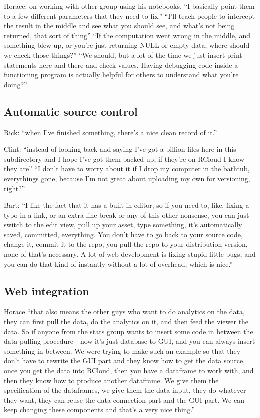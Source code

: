 Horace: on working with other group using his notebooks, ``I basically point them to a few different parameters that they need to fix.'' ``I'll teach people to intercept the result in the middle and see what you should see, and what's not being returned, that sort of thing'' ``If the computation went wrong in the middle, and something blew up, or you're just returning NULL or empty data, where should we check those things?'' ``We should, but a lot of the time we just insert print statements here and there and check values. Having debugging code inside a functioning program is actually helpful for others to understand what you're doing?''


\subsection{Automatic source control}
Rick: ``when I've finished something, there's a nice clean record of it.''

Clint: ``instead of looking back and saying I've got a billion files here in this subdirectory and I hope I've got them backed up, if they're on RCloud I know they are'' ``I don't have to worry about it if I drop my computer in the bathtub, everythings gone, because I'm not great about uploading my own for versioning, right?''

Bart: ``I like the fact that it has a built-in editor, so if you need to, like, fixing a typo in a link, or an extra line break or any of this other nonsense, you can just switch to the edit view, pull up your asset, type something, it's automatically saved, committed, everything. You don't have to go back to your source code, change it, commit it to the repo, you pull the repo to your distribution version, none of that's necessary. A lot of web development is fixing stupid little bugs, and you can do that kind of instantly without a lot of overhead, which is nice.''

\subsection{Web integration}
Horace ``that also means the other guys who want to do analytics on the data, they can first pull the data, do the analytics on it, and then feed the viewer the data. So if anyone from the stats group wants to insert some code in between the data pulling procedure - now it's just database to GUI, and you can always insert something in between. We were trying to make such an example so that they don't have to rewrite the GUI part and they know how to get the data source, once you get the data into RCloud, then you have a dataframe to work with, and then they know how to produce another dataframe. We give them the specification of the dataframes, we give them the data input, they do whatever they want, they can reuse the data connection part and the GUI part. We can keep changing these components and that's a very nice thing.''

